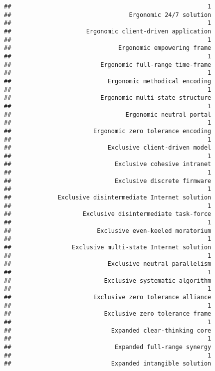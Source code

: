 \documentclass[
]{article}
\begin{document}
\begin{verbatim}
##                                                       1 
##                                 Ergonomic 24/7 solution 
##                                                       1 
##                     Ergonomic client-driven application 
##                                                       1 
##                              Ergonomic empowering frame 
##                                                       1 
##                         Ergonomic full-range time-frame 
##                                                       1 
##                           Ergonomic methodical encoding 
##                                                       1 
##                         Ergonomic multi-state structure 
##                                                       1 
##                                Ergonomic neutral portal 
##                                                       1 
##                       Ergonomic zero tolerance encoding 
##                                                       1 
##                           Exclusive client-driven model 
##                                                       1 
##                             Exclusive cohesive intranet 
##                                                       1 
##                             Exclusive discrete firmware 
##                                                       1 
##             Exclusive disintermediate Internet solution 
##                                                       1 
##                    Exclusive disintermediate task-force 
##                                                       1 
##                        Exclusive even-keeled moratorium 
##                                                       1 
##                 Exclusive multi-state Internet solution 
##                                                       1 
##                           Exclusive neutral parallelism 
##                                                       1 
##                          Exclusive systematic algorithm 
##                                                       1 
##                       Exclusive zero tolerance alliance 
##                                                       1 
##                          Exclusive zero tolerance frame 
##                                                       1 
##                            Expanded clear-thinking core 
##                                                       1 
##                             Expanded full-range synergy 
##                                                       1 
##                            Expanded intangible solution 

\end{verbatim}
\end{document}
